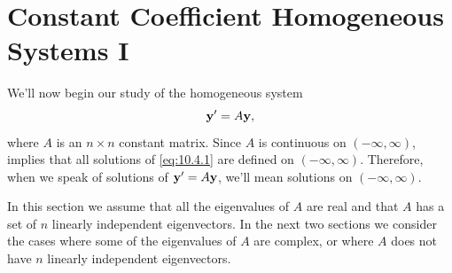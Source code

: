 \section{Constant Coefficient Homogeneous Systems I}
\label{sec:system_const_coeff_i}

We'll now begin our study of the homogeneous system
\begin{equation}\label{eq:10.4.1}
\mathbf{y}'=A\mathbf{y},
\end{equation}
where $A$ is an $n\times n$ constant matrix. Since $A$ is continuous
on $(-\infty,\infty)$, 
implies
that all solutions of \eqref{eq:10.4.1} are defined on $(-\infty,\infty)$.
Therefore, when we speak of solutions of $\mathbf{y}'=A\mathbf{y}$, we'll
mean solutions on $(-\infty,\infty)$.

In this section we assume that all the eigenvalues of $A$ are real and
that $A$ has a set of $n$ linearly independent eigenvectors. In the
next two sections we consider the cases where some of the eigenvalues
of $A$ are complex, or where $A$ does not have $n$ linearly
independent eigenvectors.

